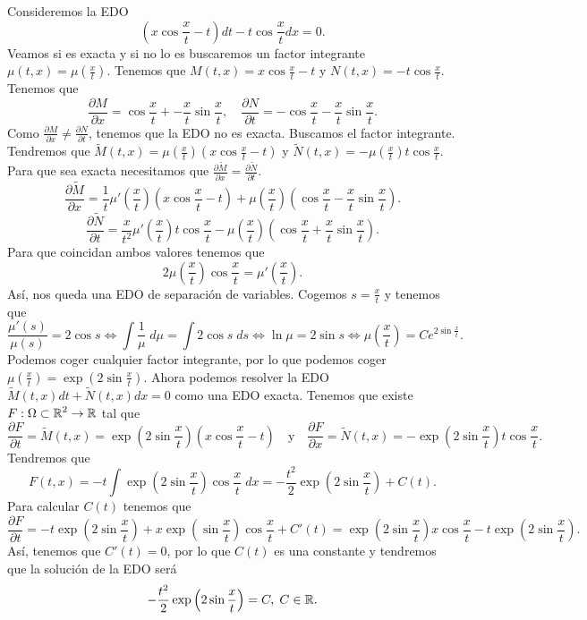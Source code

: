 \begin{eg}
Consideremos la EDO 
\[\left(x\cos \frac{x}{t}-t\right)dt - t \cos \frac{x}{t}dx = 0 .\]
Veamos si es exacta y si no lo es buscaremos un factor integrante $\displaystyle \mu\left(t,x\right)=\mu\left(\frac{x}{t}\right) $. Tenemos que $\displaystyle M\left(t,x\right)=x\cos\frac{x}{t} - t $ y $\displaystyle N\left(t,x\right)=-t \cos \frac{x}{t} $. Tenemos que 
\[\frac{\partial M}{\partial x} = \cos \frac{x}{t} + -\frac{x}{t}\sin \frac{x}{t}, \quad \frac{\partial N}{\partial t}=-\cos \frac{x}{t} - \frac{x}{t}\sin \frac{x}{t} .\]
Como $\displaystyle \frac{\partial M}{\partial x} \neq \frac{\partial N}{\partial t} $, tenemos que la EDO no es exacta. Buscamos el factor integrante. Tendremos que $\displaystyle \widetilde{M}\left(t,x\right)=\mu\left(\frac{x}{t}\right)\left(x\cos \frac{x}{t}-t\right) $ y $\displaystyle \tilde{N}\left(t,x\right)=-\mu\left(\frac{x}{t}\right)t \cos \frac{x}{t} $. Para que sea exacta necesitamos que $\displaystyle \frac{\partial \widetilde{M}}{\partial x} = \frac{\partial \tilde{N}}{\partial t} $. 
\[ \frac{\partial \widetilde{M}}{\partial x} = \frac{1}{t}\mu'\left(\frac{x}{t}\right)\left(x\cos \frac{x}{t}-t\right)+\mu\left(\frac{x}{t}\right)\left(\cos \frac{x}{t}- \frac{x}{t}\sin \frac{x}{t}\right) .\]
\[\frac{\partial \tilde{N}}{\partial t}= \frac{x}{t ^{2}}\mu'\left(\frac{x}{t}\right)t\cos \frac{x}{t} - \mu\left(\frac{x}{t}\right)\left(\cos \frac{x}{t} + \frac{x}{t} \sin \frac{x}{t}\right) .\]
Para que coincidan ambos valores tenemos que 
\[ 2\mu\left(\frac{x}{t}\right)\cos\frac{x}{t} = \mu'\left(\frac{x}{t}\right).\]
Así, nos queda una EDO de separación de variables. Cogemos $\displaystyle s = \frac{x}{t} $ y tenemos que 
\[\frac{\mu'\left(s\right)}{\mu\left(s\right)} = 2\cos s \iff \int \frac{1}{\mu} \; d\mu = \int 2\cos s \; d s \iff \ln \mu = 2\sin s \iff \mu\left(\frac{x}{t}\right) = Ce^{2\sin \frac{x}{t}} .\]
Podemos coger cualquier factor integrante, por lo que podemos coger $\displaystyle \mu \left(\frac{x}{t}\right)=\exp\left(2\sin \frac{x}{t}\right) $. Ahora podemos resolver la EDO $\displaystyle \widetilde{M}\left(t,x\right)dt + \tilde{N}\left(t,x\right)dx = 0 $ como una EDO exacta. Tenemos que existe $\displaystyle F : \Omega \subset \mathbb{R}^{2} \to \mathbb{R} $ tal que 
\[\frac{\partial F}{\partial t}=\tilde{M}\left(t,x\right)=\exp\left(2\sin \frac{x}{t}\right)\left(x\cos \frac{x}{t}-t\right) \quad \text{y} \quad \frac{\partial F}{\partial x}= \tilde{N}\left(t,x\right) = -\exp\left(2\sin \frac{x}{t}\right)t \cos \frac{x}{t}.\]
Tendremos que 
\[F\left(t,x\right) = -t\int \exp\left(2\sin \frac{x}{t}\right)\cos \frac{x}{t} \; dx = - \frac{t ^{2}}{2}\exp\left(2\sin \frac{x}{t}\right) + C\left(t\right).\]
Para calcular $\displaystyle C\left(t\right) $ tenemos que 
\[\frac{\partial F}{\partial t}=-t\exp\left(2\sin \frac{x}{t}\right) + x\exp\left(\sin \frac{x}{t}\right)\cos \frac{x}{t} + C'\left(t\right) = \exp\left(2\sin \frac{x}{t}\right)x\cos \frac{x}{t}-t\exp\left(2\sin \frac{x}{t}\right)  .\]
Así, tenemos que $\displaystyle C'\left(t\right)= 0 $, por lo que $\displaystyle C\left(t\right) $ es una constante y tendremos que la solución de la EDO será
\[-\frac{t ^{2}}{2}\exp\left(2\sin \frac{x}{t}\right) = C, \; C \in \mathbb{R} .\]
\end{eg}
